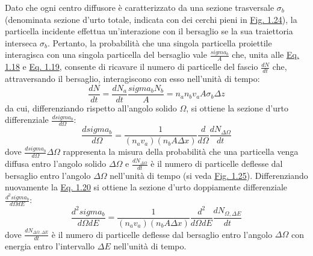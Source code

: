 \documentclass[12pt,a4paper,twoside]{report}
\begin{document}
	Dato che ogni centro diffusore è caratterizzato da una sezione trasversale $\sigma_b$ (denominata sezione d'urto totale, indicata con dei cerchi pieni in \hyperref[fig:scattering]{Fig. 1.24}), la particella incidente effettua un'interazione con il bersaglio se la sua traiettoria interseca $\sigma_b$. Pertanto, la probabilità che una singola particella proiettile interagisca con una singola particella del bersaglio vale $\frac{sigma_b}{A}$ che, unita alle \hyperref[eq:scattering1]{Eq. 1.18} e \hyperref[eq:scattering2]{Eq. 1.19}, consente di ricavare il numero di particelle del fascio $\frac{dN}{dt}$ che, attraversando il bersaglio, interagiscono con esso nell'unità di tempo:
	\begin{equation}
		\frac{dN}{dt}=\frac{dN_a}{dt}\frac{sigma_bN_b}{A}=n_an_bv_aA\sigma_b\Delta z
		\label{eq:scattering3}
	\end{equation}
	da cui, differenziando rispetto all'angolo solido $\Omega$, si ottiene la sezione d'urto differenziale $\frac{dsigma_b}{d\Omega}$:
	\begin{equation}
		\frac{dsigma_b}{d\Omega}=\frac{1}{\left(n_av_a\right)\left(n_bA\Delta x\right)}\frac{d}{d\Omega}\frac{dN_{\Delta\Omega}}{dt}
		\label{eq:scattering4}
	\end{equation}
	dove $\frac{dsigma_b}{d\Omega}\Delta \Omega$ rappresenta la misura della probabilità che una particella venga diffusa entro l'angolo solido $\Delta \Omega$ e $\frac{dN_{\Delta\Omega}}{dt}$ è il numero di particelle deflesse dal bersaglio entro l'angolo $\Delta \Omega$ nell'unità di tempo (si veda \hyperref[fig:solid_angle]{Fig. 1.25}). Differenziando nuovamente la \hyperref[eq:scattering2]{Eq. 1.20} si ottiene la sezione d'urto doppiamente differenziale $\frac{d^2sigma_b}{d\Omega dE}$:
	\begin{equation}
		\frac{d^2sigma_b}{d\Omega dE}=\frac{1}{\left(n_av_a\right)\left(n_bA\Delta x\right)}\frac{d^2}{d\Omega dE}\frac{dN_{\Omega,\Delta E}}{dt}
		\label{eq:scattering5}
	\end{equation}
	dove $\frac{dN_{\Delta\Omega,\Delta E}}{dt}$ è il numero di particelle deflesse dal bersaglio entro l'angolo $\Delta \Omega$ con energia entro l'intervallo $\Delta E$ nell'unità di tempo.
	
\end{document}

